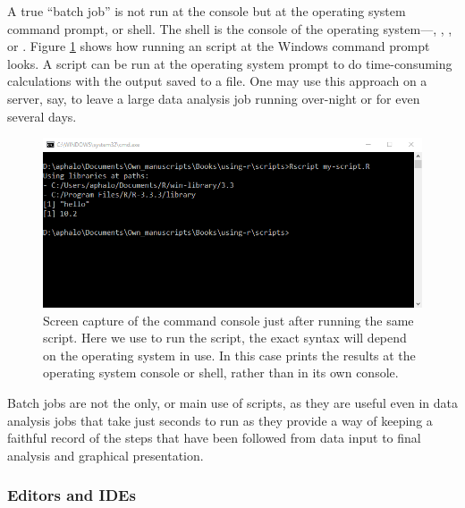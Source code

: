 \documentclass[krantz2]{krantz}\usepackage{knitr}%
\begin{document}
A true ``batch job'' is not run at the \Rpgrm console but at the operating system command prompt, or shell. The shell is the console of the operating system---, , , or . Figure \ref{fig:intro:shell} shows how running an script at the Windows command prompt looks. A script can be run at the operating system prompt to do time-consuming calculations with the output saved to a file. One may use this approach on a server, say, to leave a large data analysis job running over-night or for even several days.

\begin{figure}
  \centering
  \includegraphics[width=\linewidth]{figures/windows-cmd-script}
  \caption[Script at the Windows cmd promt]{Screen capture of the  command console just after running the same script. Here we use  to run the script, the exact syntax will depend on the operating system in use. In this case \Rpgrm prints the results at the operating system console or shell, rather than in its own \Rpgrm console.}\label{fig:intro:shell}
\end{figure}

Batch jobs are not the only, or main use of scripts, as they are useful even in data analysis jobs that take just seconds to run as they provide a way of keeping a faithful record of the steps that have been followed from data input to final analysis and graphical presentation.

\subsubsection{Editors and IDEs}
\end{document}
